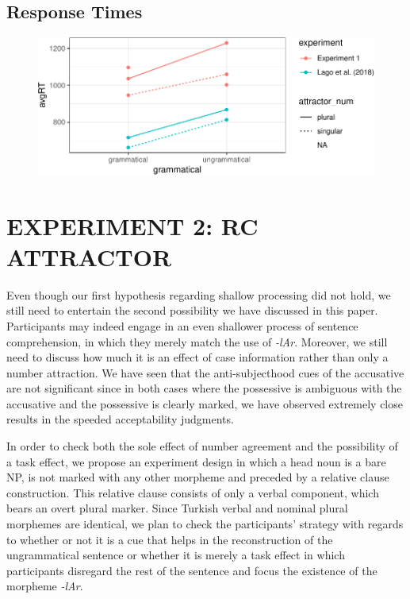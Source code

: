 \documentclass[doc]{apa6}
\begin{document}
\subsection{Response Times}\label{response-times}

\begin{figure}
\centering
\includegraphics{AgreementAttraction_files/figure-latex/exp1AvgRTs-1.pdf}
\caption{}
\end{figure}

\clearpage

\section{EXPERIMENT 2: RC ATTRACTOR}\label{experiment-2-rc-attractor}

Even though our first hypothesis regarding shallow processing did not
hold, we still need to entertain the second possibility we have
discussed in this paper. Participants may indeed engage in an even
shallower process of sentence comprehension, in which they merely match
the use of \emph{-lAr}. Moreover, we still need to discuss how much it
is an effect of case information rather than only a number attraction.
We have seen that the anti-subjecthood cues of the accusative are not
significant since in both cases where the possessive is ambiguous with
the accusative and the possessive is clearly marked, we have observed
extremely close results in the speeded acceptability judgments.

In order to check both the sole effect of number agreement and the
possibility of a task effect, we propose an experiment design in which a
head noun is a bare NP, is not marked with any other morpheme and
preceded by a relative clause construction. This relative clause
consists of only a verbal component, which bears an overt plural marker.
Since Turkish verbal and nominal plural morphemes are identical, we plan
to check the participants' strategy with regards to whether or not it is
a cue that helps in the reconstruction of the ungrammatical sentence or
whether it is merely a task effect in which participants disregard the
rest of the sentence and focus the existence of the morpheme
\emph{-lAr}.
\end{document}
